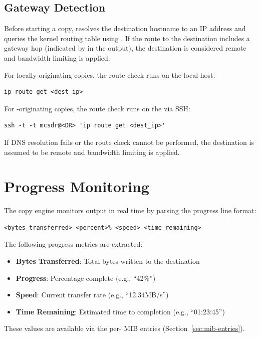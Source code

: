 \subsection{Gateway Detection}

Before starting a copy, \SC{} resolves the destination hostname to an IP address and queries the kernel routing table using . If the route to the destination includes a gateway hop (indicated by  in the output), the destination is considered remote and bandwidth limiting is applied.

For locally originating copies, the route check runs on the local host:
\begin{lstlisting}
ip route get <dest_ip>
\end{lstlisting}

For \DR{}-originating copies, the route check runs on the \DR{} via SSH:
\begin{lstlisting}
ssh -t -t mcsdr@<DR> 'ip route get <dest_ip>'
\end{lstlisting}

If DNS resolution fails or the route check cannot be performed, the destination is assumed to be remote and bandwidth limiting is applied.

\section{Progress Monitoring}

The copy engine monitors  output in real time by parsing the progress line format:

\begin{lstlisting}
<bytes_transferred> <percent>% <speed> <time_remaining>
\end{lstlisting}

The following progress metrics are extracted:
\begin{itemize}
    \item \textbf{Bytes Transferred}: Total bytes written to the destination
    \item \textbf{Progress}: Percentage complete (e.g., ``42\%'')
    \item \textbf{Speed}: Current transfer rate (e.g., ``12.34MB/s'')
    \item \textbf{Time Remaining}: Estimated time to completion (e.g., ``01:23:45'')
\end{itemize}

These values are available via the per-\DR{}  MIB entries (Section~\ref{sec:mib-entries}).

